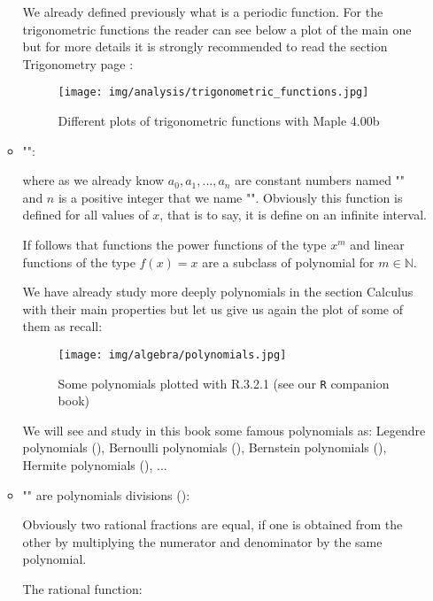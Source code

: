 \begin{enumerate}
\begin{itemize}
			We already defined previously what is a periodic function. For the trigonometric functions the reader can see below a plot of the main one but for more details it is strongly recommended to read the section Trigonometry page \pageref{trigonometry}:
			\begin{figure}[H]
				\centering
				\texttt{[image: img/analysis/trigonometric\_functions.jpg]}
				\caption{Different plots of trigonometric functions with Maple 4.00b}
			\end{figure}
			
			\item "":
			
			
			where as we already know $a_0,a_1,...,a_n$ are constant numbers named "" and $n$ is a positive integer that we name "". Obviously this function is defined for all values of $x$, that is to say, it is define on an infinite interval.
			
			If follows that functions the power functions of the type $x^m$ and linear functions of the type $f(x)=x$ are a subclass of polynomial for $m\in \mathbb{N}$.
			
			We have already study more deeply polynomials in the section Calculus with their main properties but let us give us again the plot of some of them as recall: 
			\begin{figure}[H]
				\centering
				\texttt{[image: img/algebra/polynomials.jpg]}
				\caption[Some polynomials plotted with R.3.2.1]{Some polynomials plotted with R.3.2.1 (see our \texttt{R} companion book)}
			\end{figure}
			We will see and study in this book some famous polynomials as: Legendre polynomials (), Bernoulli polynomials (), Bernstein polynomials (), Hermite polynomials (), ...
			
			\item "" are polynomials divisions ():
			
			\begin{tcolorbox}[title=Remark,colframe=black,arc=10pt]
			Obviously two rational fractions are equal, if one is obtained from the other by multiplying the numerator and denominator by the same polynomial.
			\end{tcolorbox}
			The rational function:
			

\end{itemize}
\end{enumerate}
